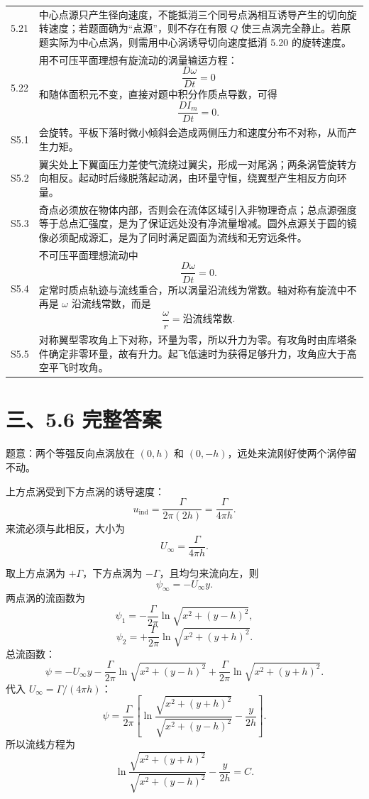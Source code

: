 \documentclass[UTF8,zihao=-4]{ctexart}
\begin{document}
\begin{longtable}{p{1.3cm}p{12.6cm}}
5.21 &
中心点源只产生径向速度，不能抵消三个同号点涡相互诱导产生的切向旋转速度；若题面确为“点源”，则不存在有限 $Q$ 使三点涡完全静止。若原题实际为中心点涡，则需用中心涡诱导切向速度抵消 5.20 的旋转速度。\\

5.22 &
用不可压平面理想有旋流动的涡量输运方程：
\[
\frac{D\omega}{Dt}=0
\]
和随体面积元不变，直接对题中积分作质点导数，可得
\[
\frac{D I_m}{Dt}=0.
\]\\

S5.1 &
会旋转。平板下落时微小倾斜会造成两侧压力和速度分布不对称，从而产生力矩。\\

S5.2 &
翼尖处上下翼面压力差使气流绕过翼尖，形成一对尾涡；两条涡管旋转方向相反。起动时后缘脱落起动涡，由环量守恒，绕翼型产生相反方向环量。\\

S5.3 &
奇点必须放在物体内部，否则会在流体区域引入非物理奇点；总点源强度等于总点汇强度，是为了保证远处没有净流量增减。圆外点源关于圆的镜像必须配成源汇，是为了同时满足圆面为流线和无穷远条件。\\

S5.4 &
不可压平面理想流动中
\[
\frac{D\omega}{Dt}=0.
\]
定常时质点轨迹与流线重合，所以涡量沿流线为常数。轴对称有旋流中不再是 $\omega$ 沿流线常数，而是
\[
\frac{\omega}{r}=\text{沿流线常数}.
\]\\

S5.5 &
对称翼型零攻角上下对称，环量为零，所以升力为零。有攻角时由库塔条件确定非零环量，故有升力。起飞低速时为获得足够升力，攻角应大于高空平飞时攻角。\\

\bottomrule
\end{longtable}

\section*{三、5.6 完整答案}

题意：两个等强反向点涡放在 $(0,h)$ 和 $(0,-h)$，远处来流刚好使两个涡停留不动。

上方点涡受到下方点涡的诱导速度：
\[
u_{\text{ind}}=\frac{\Gamma}{2\pi(2h)}
=\frac{\Gamma}{4\pi h}.
\]
来流必须与此相反，大小为
\[
U_\infty=\frac{\Gamma}{4\pi h}.
\]

取上方点涡为 $+\Gamma$，下方点涡为 $-\Gamma$，且均匀来流向左，则
\[
\psi_\infty=-U_\infty y.
\]
两点涡的流函数为
\[
\psi_1=-\frac{\Gamma}{2\pi}\ln\sqrt{x^2+(y-h)^2},
\]
\[
\psi_2=+\frac{\Gamma}{2\pi}\ln\sqrt{x^2+(y+h)^2}.
\]
总流函数：
\[
\psi
=-U_\infty y
-\frac{\Gamma}{2\pi}\ln\sqrt{x^2+(y-h)^2}
+\frac{\Gamma}{2\pi}\ln\sqrt{x^2+(y+h)^2}.
\]
代入 $U_\infty=\Gamma/(4\pi h)$：
\[
\psi=
\frac{\Gamma}{2\pi}
\left[
\ln
\frac{\sqrt{x^2+(y+h)^2}}
{\sqrt{x^2+(y-h)^2}}
-\frac{y}{2h}
\right].
\]
所以流线方程为
\[
\boxed{
\ln
\frac{\sqrt{x^2+(y+h)^2}}
{\sqrt{x^2+(y-h)^2}}
-\frac{y}{2h}=C
}.
\]
\end{document}
